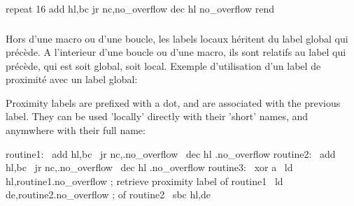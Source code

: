 %
%

\begin{code}
repeat 16
  add hl,bc
  jr nc,\at no\_overflow
  dec hl
\at no\_overflow
rend
\end{code}

\subsubsection{}

\begin{xfr}
Hors d'une macro ou d'une boucle, les labels locaux héritent du label global qui précède. 
A l'interieur d'une boucle ou d'une macro, ils sont relatifs au label qui précède, qui est soit global, soit local.
Exemple d'utilisation d'un label de proximité avec un label global:
\end{xfr}

\begin{xen}
Proximity labels are prefixed with a dot, and are associated with the previous label. 
They can be used 'locally' directly with their 'short' names, and anymwhere with their full name:
\end{xen}

\begin{code}
routine1:
\ add hl,bc
\ jr nc,.no\_overflow
\ dec hl
.no\_overflow
\medskip
routine2:
\ add hl,bc
\ jr nc,.no\_overflow
\ dec hl
.no\_overflow
\medskip
routine3:
\ xor a
\ ld hl,routine1.no\_overflow ; retrieve proximity label of routine1
\ ld de,routine2.no\_overflow ; of routine2
\ sbc hl,de
\end{code}

\subsubsection{}

